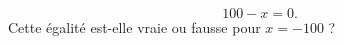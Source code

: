 

\begin{equation}
    100-x=0.
\end{equation}
Cette égalité est-elle vraie ou fausse pour \( x=-100\) ?

